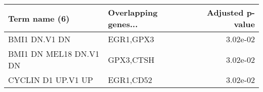 \begin{tabular}{llr}
\toprule
         Term name (6) & Overlapping genes... &  Adjusted p-value \\
\midrule
         BMI1 DN.V1 DN &            EGR1,GPX3 &          3.02e-02 \\
BMI1 DN MEL18 DN.V1 DN &            GPX3,CTSH &          3.02e-02 \\
    CYCLIN D1 UP.V1 UP &            EGR1,CD52 &          3.02e-02 \\
\bottomrule
\end{tabular}
